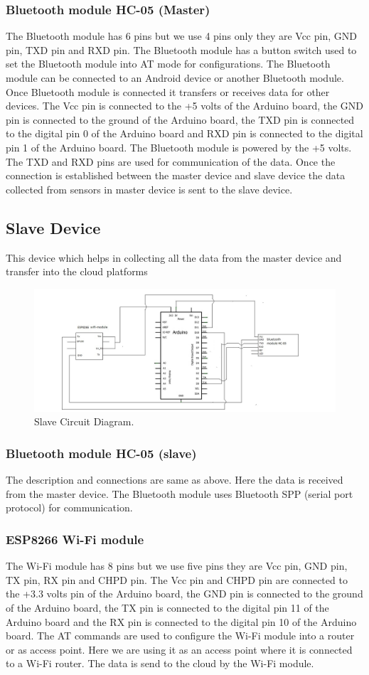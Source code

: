 \subsubsection{Bluetooth module HC-05 (Master)}
The Bluetooth module has 6 pins but we use 4 pins only they are Vcc pin, GND pin, TXD pin and RXD pin. The Bluetooth module has a button switch used to set the Bluetooth module into AT mode for configurations. The Bluetooth module can be connected to an Android device or another Bluetooth module. Once Bluetooth module is connected it transfers or receives data for other devices. The Vcc pin is connected to the +5 volts of the Arduino board, the GND pin is connected to the ground of the Arduino board, the TXD pin is
connected to the digital pin 0 of the Arduino board and RXD pin is connected to the digital pin 1 of the Arduino board. The Bluetooth module is powered by the +5 volts. The TXD and RXD pins are used for communication of the data. Once the connection is established between the master device and slave device the data collected from sensors in master device is sent to the slave device.
\subsection{Slave Device}
This device which helps in collecting all the data from the master device and transfer into the cloud platforms 
\begin{figure}[h]
\centerline{\includegraphics[width=5.7in]{SC}}
\caption{ Slave Circuit Diagram.}
\end{figure}
\subsubsection{Bluetooth module HC-05 (slave)}
The description and connections are same as above. Here the data is received from the master device. The Bluetooth module uses Bluetooth SPP (serial port protocol) for communication.
\subsubsection{ESP8266 Wi-Fi module}
The Wi-Fi module has 8 pins but we use five pins they are Vcc pin, GND pin, TX pin, RX pin and CHPD pin. The Vcc pin and CHPD pin are connected to the +3.3 volts pin of the Arduino board, the GND pin is connected to the ground of the Arduino board, the TX pin is connected to the digital pin 11 of the Arduino board and the RX pin is connected to the digital pin 10 of the Arduino board. The AT commands are used to configure the Wi-Fi module into a router or as access point. Here we are using it as an access point where it is connected to a Wi-Fi router. The data is send to the cloud by the Wi-Fi module.

